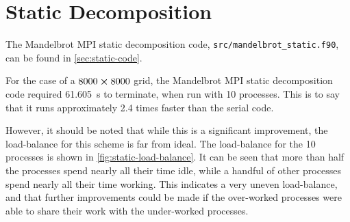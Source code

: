 \documentclass{article}
\begin{document}
\clearpage
\section{Static Decomposition}
\label{sec:static}

The Mandelbrot MPI static decomposition code,
\lstinline[style=ff]{src/mandelbrot_static.f90}, can be found in
\autoref{sec:static-code}.

For the case of a $8000 \cross 8000$ grid, the Mandelbrot MPI static
decomposition code required \SI{61.605}{\second} to terminate, when run with 10
processes.
This is to say that it runs approximately 2.4 times faster than the serial code.

However, it should be noted that while this is a significant improvement, the
load-balance for this scheme is far from ideal.
The load-balance for the 10 processes is shown in
\autoref{fig:static-load-balance}.
It can be seen that more than half the processes spend nearly all their time
idle, while a handful of other processes spend nearly all their time working.
This indicates a very uneven load-balance, and that further improvements could
be made if the over-worked processes were able to share their work with the
under-worked processes.
\end{document}

